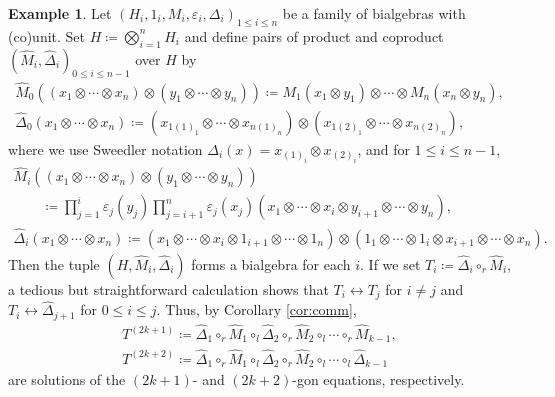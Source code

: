 \documentclass[pdftex]{sigma}
\numberwithin{equation}{section}
\theoremstyle{definition}
\newtheorem{Example}[Theorem]{Example}
\begin{document}
\begin{Example}
 Let $(H_i,1_i,M_i,\varepsilon_i,\Delta_i)_{1\leq i\leq n}$ be a family of bialgebras with (co)unit.
 Set $H \coloneqq \bigotimes_{i=1}^{n}H_i$ and define pairs of product and coproduct $(\widehat{M}_i,\widehat{\Delta}_i)_{0\leq i\leq n-1}$ over $H$ by
 \begin{gather*}
 \widehat{M}_0((x_1 \otimes \cdots \otimes x_n) \otimes (y_1 \otimes \cdots \otimes y_n)) \coloneqq
 M_1(x_1 \otimes y_1) \otimes \cdots \otimes M_n(x_n \otimes y_n),\\
 \widehat{\Delta}_0(x_1 \otimes \cdots \otimes x_n) \coloneqq (x_{1(1)_1} \otimes \cdots \otimes x_{n(1)_n}) \otimes (x_{1(2)_1} \otimes \cdots \otimes x_{n(2)_n}),
 \end{gather*}
 where we use Sweedler notation $\Delta_i(x)=x_{(1)_i}\otimes x_{(2)_i}$, and for $1 \leq i \leq n-1$,
 \begin{gather*}
 \widehat{M}_i((x_1 \otimes \cdots \otimes x_n) \otimes (y_1 \otimes \cdots \otimes y_n)) \\
 \qquad{} \coloneqq
 \prod_{j=1}^{i}\varepsilon_j(y_j)\prod_{j=i+1}^{n}\varepsilon_j(x_j)(x_1 \otimes \cdots \otimes x_i \otimes y_{i+1} \otimes \cdots \otimes y_n),\\
 \widehat{\Delta}_i(x_1 \otimes \cdots \otimes x_n) \coloneqq (x_1 \otimes \cdots \otimes x_i \otimes 1_{i+1} \otimes \cdots \otimes 1_{n}) \otimes (1_{1} \otimes \cdots \otimes 1_{i} \otimes x_{i+1} \otimes \cdots \otimes x_n).
 \end{gather*}
 Then the tuple $(H, \widehat{M}_i,\widehat{\Delta}_i)$ forms a bialgebra for each $i$.
 If we set $T_i\coloneqq\widehat{\Delta}_i \circ_r \widehat{M}_i$, a tedious but straightforward calculation shows that $T_i\leftrightarrow T_j$ for $i\neq j$ and $T_i\leftrightarrow \widehat{\Delta}_{j+1}$ for $0\leq i \leq j$.
 Thus, by Corollary \ref{cor:comm},
 \begin{gather*}
 T^{(2k+1)} \coloneqq \widehat{\Delta}_1 \circ_r \widehat{M}_1 \circ_l \widehat{\Delta}_2 \circ_r \widehat{M}_2 \circ_l \cdots \circ_{r} \widehat{M}_{k-1}, \\
 T^{(2k+2)} \coloneqq \widehat{\Delta}_1 \circ_r \widehat{M}_1 \circ_l \widehat{\Delta}_2 \circ_r \widehat{M}_2 \circ_l \cdots \circ_{l} \widehat{\Delta}_{k-1}
 \end{gather*}
 are solutions of the $(2k+1)$- and $(2k+2)$-gon equations, respectively.
\end{Example}
\end{document}
